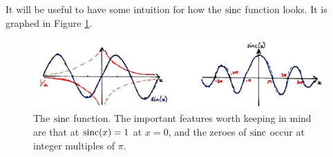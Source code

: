 %
It will be useful to have some intuition for how the $\operatorname{sinc}$ function looks. It is
graphed in Figure \ref{fig::lecture_4_sinc}.
%
\begin{figure}[!htb]
  \includegraphics[width=\textwidth]{images/lecture_4_sinc.JPG}
  \caption{
    The $\operatorname{sinc}$ function. The important features worth keeping in mind are
    that at $\operatorname{sinc}(x) = 1$ at $x=0$, and the zeroes of $\operatorname{sinc}$ occur at
    integer multiples of $\pi$.
  }
  \label{fig::lecture_4_sinc}
\end{figure}

